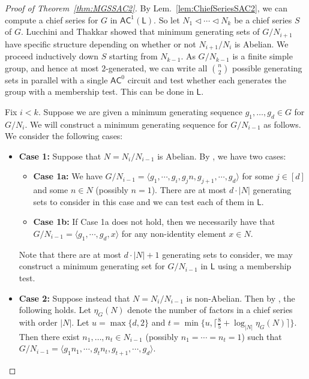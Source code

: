 \documentclass{article}
\newcommand{\Lem}[1]{Lem.~\ref{#1}\xspace}
\newcommand*{\ComplexityClass}[1]{\ensuremath{\mathsf{#1}}\xspace}
\newcommand*{\LogSpace}{\ComplexityClass{L}}
\newcommand{\AC}{\ComplexityClass{AC}}
\begin{document}
\begin{proof}[Proof of Theorem~\ref{thm:MGSSAC2}]
By \Lem{lem:ChiefSeriesSAC2}, we can compute a chief series for $G$ in $\AC^{1}(\LogSpace)$. So let $N_1 \triangleleft \cdots \triangleleft N_k$ be a chief series $S$ of $G$.  Lucchini and Thakkar \cite{LucchiniThakkar} showed that minimum generating sets of $G / N_{i+1}$ have specific structure depending on whether or not $N_{i+1}/N_{i}$ is Abelian. We proceed inductively down $S$ starting from $N_{k-1}$. As $G / N_{k-1}$ is a finite simple group, and hence at most $2$-generated, we can write all $\binom{n}{2}$ possible generating sets in parallel with a single $\AC^0$ circuit and test whether each generates the group with a membership test. This can be done in $\LogSpace$. 

Fix $i < k$. Suppose we are given a minimum generating sequence $g_{1}, \ldots, g_{d} \in G$ for $G/N_{i}$. We will construct a minimum generating sequence for $G/N_{i-1}$ as follows. We consider the following cases:
\begin{itemize}
\item \textbf{Case 1:} Suppose that $N = N_{i}/N_{i-1}$ is Abelian. By \cite[Theorem~4]{LucchiniMenegazzo}, we have two cases: 
\begin{itemize}

\item \textbf{Case 1a:} We have $G/N_{i-1} = \langle g_1, \cdots, g_i, g_j n, g_{j+1}, \cdots, g_d \rangle$ for some $j \in [d]$ and some $n \in N$ (possibly $n = 1$). There are at most $d \cdot |N|$ generating sets to consider in this case and we can test each of them in $\LogSpace$. 

\item \textbf{Case 1b:} If Case 1a does not hold, then we necessarily have that \\ $G/N_{i-1} = \langle g_1, \cdots, g_d, x \rangle$ for any non-identity element $x \in N$.
\end{itemize}

Note that there are at most $d \cdot |N| + 1$ generating sets to consider, we may construct a minimum generating set for $G/N_{i-1}$ in $\LogSpace$ using a membership test.

\item \textbf{Case 2:} Suppose instead that $N = N_{i}/N_{i-1}$ is non-Abelian. Then by \cite[Corollary 13]{LucchiniThakkar}, the following holds. Let $\eta_{G}(N)$ denote the number of factors in a chief series with order $|N|$. Let $u = \max\{d, 2\}$ and $t = \min\{u, \lceil \frac{8}{5} + \log_{\lvert N \rvert}\eta_G(N) \rceil\}$. Then there exist $n_{1}, \ldots, n_{t} \in N_{i-1}$ (possibly $n_1 = \cdots = n_t = 1$) such that $G/N_{i-1} = \langle g_1n_1, \cdots, g_tn_t, g_{t+1}, \cdots, g_d \rangle$.


\end{itemize}
\end{proof}
\end{document}
